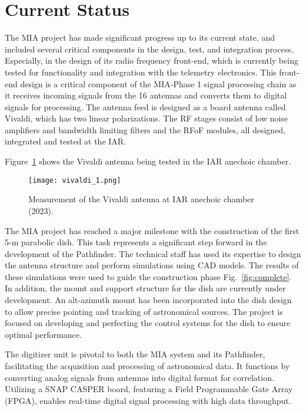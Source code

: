 \documentclass[baaa]{baaa}
\begin{document}
\section{Current Status}
\label{sec:status}
The MIA project has made significant progress up to its current state, and included several critical components in the design, test, and integration process. Especially, in the design of its radio frequency front-end, which is currently being tested for functionality and integration with the telemetry electronics. This front-end design is a critical component of the MIA-Phase 1 signal processing chain as it receives incoming signals from the 16 antennas and converts them to digital signals for processing. The antenna feed is designed as a board antenna called Vivaldi, which has two linear polarizations. The RF stages consist of low noise amplifiers and bandwidth limiting filters and the RFoF modules, all designed, integrated and tested at the IAR.

Figure~\ref{fig:antcai} shows the Vivaldi antenna being tested in the IAR anechoic chamber.

\begin{figure}[!t]
  \texttt{[image: vivaldi\_1.png]}
  \caption{{Measurement of the Vivaldi antenna at IAR anechoic chamber (2023).}}
  \label{fig:antcai}
\end{figure}

The MIA project has reached a major milestone with the construction of the first 5-m parabolic dish. This task represents a significant step forward in the development of the Pathfinder. The technical staff has used its expertise to design the antenna structure and perform simulations using CAD models. The results of these simulations were used to guide the construction phase Fig.~\ref{fig:complete}. In addition, the mount and support structure for the dish are currently under development. An alt-azimuth mount has been incorporated into the dish design to allow precise pointing and tracking of astronomical sources. The project is focused on developing and perfecting the control systems for the dish to ensure optimal performance.

The digitizer unit is pivotal to both the MIA system and its Pathfinder, facilitating the acquisition and processing of astronomical data. It functions by converting analog signals from antennas into digital format for correlation. Utilizing a SNAP CASPER board, featuring a Field Programmable Gate Array (FPGA), enables real-time digital signal processing with high data throughput.
\end{document}
